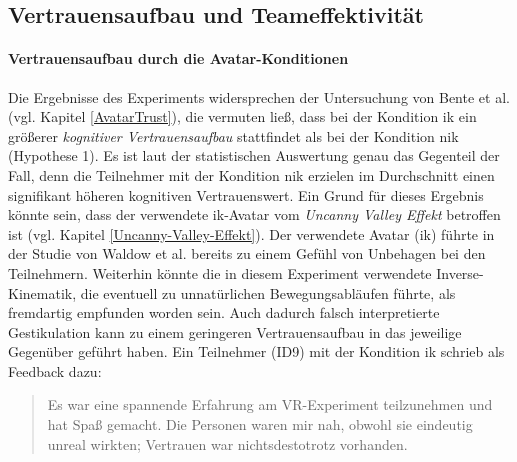 \documentclass[a4paper,11pt]{article}%
\renewcommand{\\}{\vspace*{0.5\baselineskip} \newline}
\begin{document}
{{%




%


\subsection{Vertrauensaufbau und Teameffektivität}
\paragraph{Vertrauensaufbau durch die Avatar-Konditionen}

Die Ergebnisse des Experiments widersprechen der Untersuchung von Bente et al. (vgl. Kapitel \ref{AvatarTrust}), die vermuten ließ, dass bei der Kondition \ac{ik} ein größerer \textit{kognitiver Vertrauensaufbau} stattfindet als bei der Kondition \ac{nik} (Hypothese 1). Es ist laut der statistischen Auswertung genau das Gegenteil der Fall, denn die Teilnehmer mit der Kondition \ac{nik} erzielen im Durchschnitt einen signifikant höheren kognitiven Vertrauenswert.
Ein Grund für dieses Ergebnis könnte sein, dass der verwendete \ac{ik}-Avatar vom \textit{Uncanny Valley Effekt} betroffen ist (vgl. Kapitel \ref{Uncanny-Valley-Effekt}). Der verwendete Avatar (\ac{ik}) führte in der Studie von Waldow et al. \citep{waldow2019investigating} bereits zu einem Gefühl von Unbehagen bei den Teilnehmern.
Weiterhin könnte die in diesem Experiment verwendete Inverse-Kinematik, die eventuell zu unnatürlichen Bewegungsabläufen führte, als fremdartig empfunden worden sein. Auch dadurch falsch interpretierte Gestikulation kann zu einem geringeren Vertrauensaufbau in das jeweilige Gegenüber geführt haben. Ein Teilnehmer (ID9) mit der Kondition \ac{ik} schrieb als Feedback dazu:
\begin{quote}
\glqq{}Es war eine spannende Erfahrung am VR-Experiment teilzunehmen und hat Spaß gemacht. Die
Personen waren mir nah, obwohl sie eindeutig unreal wirkten; Vertrauen war nichtsdestotrotz vorhanden.\dq{}
\end{quote}

}}
\end{document}
